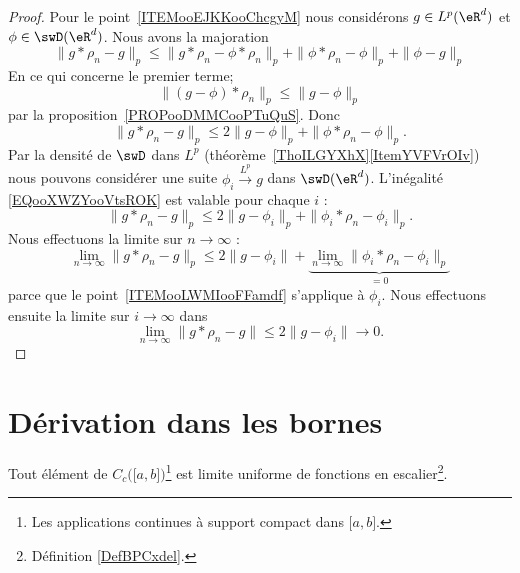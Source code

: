 \begin{proof}
	Pour le point~\ref{ITEMooEJKKooChcgyM} nous considérons \( g\in L^p(\eR^d)\) et \( \phi\in \swD(\eR^d)\). Nous avons la majoration
	\begin{equation}
		\| g*\rho_n-g \|_p\leq \| g*\rho_n-\phi*\rho_n \|_p+\| \phi*\rho_n-\phi \|_p+\| \phi-g \|_p
	\end{equation}
	En ce qui concerne le premier terme;
	\begin{equation}
		\| (g-\phi)*\rho_n \|_p\leq \| g-\phi \|_p
	\end{equation}
	par la proposition~\ref{PROPooDMMCooPTuQuS}. Donc
	\begin{equation}		\label{EQooXWZYooVtsROK}
		\| g*\rho_n-g \|_p\leq 2\| g-\phi \|_p+\| \phi*\rho_n-\phi \|_p.
	\end{equation}
	Par la densité de \( \swD\) dans \( L^p\) (théorème~\ref{ThoILGYXhX}\ref{ItemYVFVrOIv}) nous pouvons considérer une suite \( \phi_i\stackrel{L^p}{\longrightarrow}g\) dans \( \swD(\eR^d)\). L'inégalité \eqref{EQooXWZYooVtsROK} est valable pour chaque \( i\) :
	\begin{equation}
		\| g*\rho_n-g \|_p\leq 2\| g-\phi_i \|_p+\| \phi_i*\rho_n-\phi_i \|_p.
	\end{equation}
	Nous effectuons la limite sur \( n\to \infty\) :
	\begin{equation}
		\lim_{n\to \infty} \| g*\rho_n-g \|_p\leq 2\| g-\phi_i \|+\underbrace{\lim_{n\to \infty} \| \phi_i*\rho_n-\phi_i \|_p}_{=0}
	\end{equation}
	parce que le point~\ref{ITEMooLWMIooFFamdf} s'applique à \( \phi_i\). Nous effectuons ensuite la limite sur \( i\to \infty\) dans
	\begin{equation}
		\lim_{n\to \infty} \| g*\rho_n-g \|\leq 2\| g-\phi_i \|\to 0.
	\end{equation}
\end{proof}


\section{Dérivation dans les bornes}


\begin{proposition}	\label{PROPooSBBOooHdtWDK}
	Tout élément de \( C_c\big( \mathopen[ a,b\mathclose] \big)\)\footnote{Les applications continues à support compact dans \( \mathopen[ a,b\mathclose]\).} est limite uniforme de fonctions en escalier\footnote{Définition \ref{DefBPCxdel}.}.
\end{proposition}

